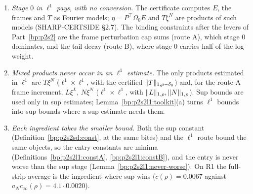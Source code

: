\begin{remark}
\begin{enumerate}[label=(\roman*)]
  is at least $0.16\varrho>300$ times its sup bound, while the next solve gains at most $18$; the per-ingredient minimum would never select it. The
  linear part needs in addition $\norm{T_s}_1$, whose increments contain $DX_h\circ K_{s}-DX_h\circ K_{s-1}$ (again a conversion). Route B's new errors contain $\Delta^2X$, $X_N\xi^N$ (through $C_{\tilde E}$)
  and the composition $\tilde E\circ\varphi$: the same conclusion, and Lemma~\ref{bp:p2s2l1:convert}(b) would add the Wiener exponential to Lean.
  The alternative, $h$ in a Fourier--Taylor norm (PLAN \S3), is a new hypothesis outside the frozen sup data (D12), a new certificate primitive
  and a composition layer of $\approx1.5$k Lean lines; it would add at most the stage-$1$ share of the gain (a quarter of the log-gain of the
  quadratic condition, nothing for the cap sums, which stage $0$ dominates).
\item \emph{Stage $0$ in $\ell^1$ pays, with no conversion.} The certificate computes $E$, the frames and $T$ as Fourier models; $\eta=P^\top\Omega_0E$
  and $T\xi^N$ are products of such models (SHARP-CERTSIDE \S2.7). The binding constraints after the levers of Part~\ref{bp:p2s2} are the frame
  perturbation cap sums (route A), which stage $0$ dominates, and the tail decay (route B), where stage $0$ carries half of the log-weight.
\item \emph{Mixed products never occur in an $\ell^1$ estimate.} The only products estimated in $\ell^1$ are $T\xi^N$ ($\ell^1\times\ell^1$, with the
  certified $\lVert T\rVert_{1,\rho-\delta_0}$) and, for the route-A frame increment, $L\xi^L$, $N\xi^N$ ($\ell^1\times\ell^1$, with $\lVert L\rVert_{1,\rho},\lVert N\rVert_{1,\rho}$).
  Sup bounds are used only in sup estimates; Lemma~\ref{bp:p2s2l1:toolkit}(a) turns $\ell^1$ bounds into sup bounds where a sup estimate needs
  them.
\item \emph{Each ingredient takes the smaller bound.} Both the sup constant (Definition~\ref{bp:p2s2sd:const}, at the same bites) and the $\ell^1$
  route bound the same objects, so the entry constants are minima (Definitions~\ref{bp:p2s2l1:constA}, \ref{bp:p2s2l1:constB}), and the entry
  is never worse than the sup stage (Lemma~\ref{bp:p2s2l1:never-worse}). On R1 the full-strip average is the ingredient where sup wins
  ($c(\rho)=0.0067$ against $a_N c_\infty(\rho)=4.1\cdot0.0020$).
\end{enumerate}
\end{remark}

